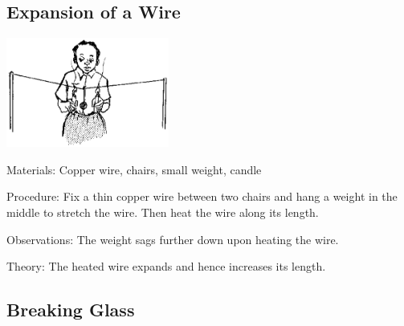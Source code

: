 \begin{multicols}{2}
\subsection{Expansion of a Wire}

\begin{center}
\includegraphics[width=0.4\textwidth]{./img/source/expansion-wire.png}
\end{center}

\begin{description*}
\item[Materials:]{Copper wire, chairs, small weight, candle}
\item[Procedure:]{Fix a thin copper wire between two chairs and hang a weight in the middle to stretch the wire. Then heat the wire along its length.}
\item[Observations:]{The weight sags further down upon heating the wire.}
\item[Theory:]{The heated wire expands and hence increases its length.}
\end{description*}

\columnbreak

\subsection{Breaking Glass}



\end{multicols}
